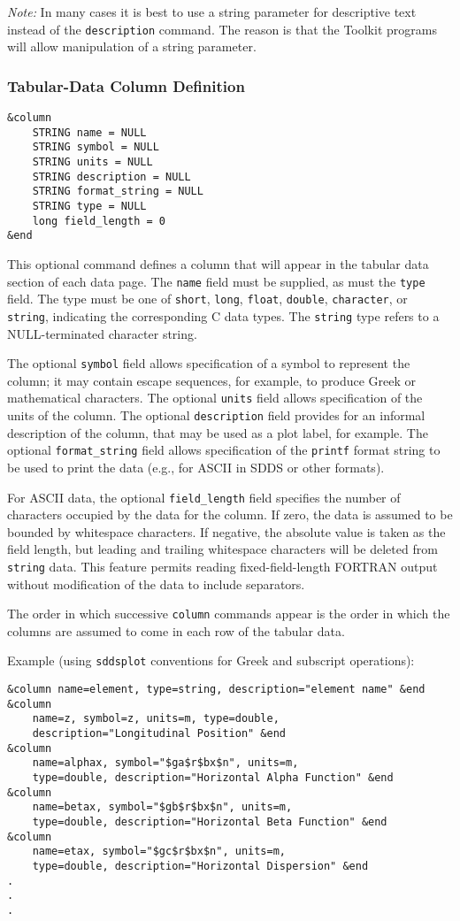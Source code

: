 \documentclass[11pt]{article}
\begin{document}
{\em Note:} In many cases it is best to use a string parameter for descriptive text instead of the {\tt description} command.  The reason is that the Toolkit programs will allow manipulation of a string parameter.

\subsubsection{Tabular-Data Column Definition}
\begin{verbatim}
&column
    STRING name = NULL
    STRING symbol = NULL
    STRING units = NULL
    STRING description = NULL
    STRING format_string = NULL
    STRING type = NULL
    long field_length = 0
&end
\end{verbatim}

This optional command defines a column that will appear in the tabular data section of each data page.  The {\tt name} field must be supplied, as must the {\tt type} field.  The type must be one of {\tt short}, {\tt long}, {\tt float}, {\tt double}, {\tt character}, or {\tt string}, indicating the corresponding C data types.  The {\tt string} type refers to a NULL-terminated character string.

The optional {\tt symbol} field allows specification of a symbol to represent the column; it may contain escape sequences, for example, to produce Greek or mathematical characters.  The optional {\tt units} field allows specification of the units of the column.  The optional {\tt description} field provides for an informal description of the column, that may be used as a plot label, for example.  The optional {\tt format\_string} field allows specification of the {\tt printf} format string to be used to print the data (e.g., for ASCII in SDDS or other formats).

For ASCII data, the optional {\tt field\_length} field specifies the number of characters occupied by the data for the column.  If zero, the data is assumed to be bounded by whitespace characters.  If negative, the absolute value is taken as the field length, but leading and trailing whitespace characters will be deleted from {\tt string} data.  This feature permits reading fixed-field-length FORTRAN output without modification of the data to include separators.

The order in which successive {\tt column} commands appear is the order in which the columns are assumed to come in each row of the tabular data.

Example (using {\tt sddsplot} conventions for Greek and subscript operations):
\begin{verbatim}
&column name=element, type=string, description="element name" &end
&column 
    name=z, symbol=z, units=m, type=double, 
    description="Longitudinal Position" &end
&column 
    name=alphax, symbol="$ga$r$bx$n", units=m, 
    type=double, description="Horizontal Alpha Function" &end
&column 
    name=betax, symbol="$gb$r$bx$n", units=m, 
    type=double, description="Horizontal Beta Function" &end
&column 
    name=etax, symbol="$gc$r$bx$n", units=m, 
    type=double, description="Horizontal Dispersion" &end
.
.
.
\end{verbatim}
\end{document}
